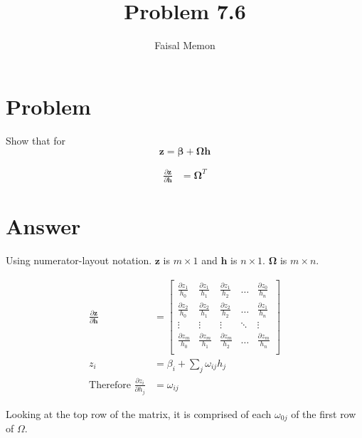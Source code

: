 \documentclass{article}
\title{Problem 7.6}
\author{Faisal Memon}
\begin{document}
\maketitle

\section{Problem}

Show that for \begin{equation*}
   \boldsymbol{z} = \boldsymbol{\beta} + \boldsymbol{\Omega}\boldsymbol{h}
\end{equation*}

\begin{align*}
   \frac{\partial{\boldsymbol{z}}}{\partial{\boldsymbol{h}}} &= \boldsymbol{\Omega}^{T}
\end{align*}

\section{Answer} 

Using numerator-layout notation. $\boldsymbol{z}$ is $ m \times 1 $ and $\boldsymbol{h}$ is $n \times 1$. $\boldsymbol{\Omega}$ is $m \times n$.

\begin{align*}
   \frac{\partial{\boldsymbol{z}}}{\partial{\boldsymbol{h}}} &=
   \begin{bmatrix}
      \frac{\partial{z}_{1}}{h_{0}} & \frac{\partial{z}_{1}}{h_{1}} &\frac{\partial{z}_{1}}{h_{2}} & \dots  & \frac{\partial{z}_{0}}{h_{n}} \\
      \frac{\partial{z}_{2}}{h_{0}} & \frac{\partial{z}_{2}}{h_{1}} &\frac{\partial{z}_{2}}{h_{2}} & \dots  & \frac{\partial{z}_{1}}{h_{n}} \\
      \vdots & \vdots & \vdots & \ddots & \vdots \\
      \frac{\partial{z}_{m}}{h_{0}} & \frac{\partial{z}_{m}}{h_{1}} &\frac{\partial{z}_{m}}{h_{2}} & \dots  & \frac{\partial{z}_{m}}{h_{n}} \\
  \end{bmatrix}
  \\
  z_{i} &= \beta_{i} + \sum_{j}\omega_{ij}h_{j} \\
  \text{Therefore }\frac{\partial{z_{i}}}{\partial{h_{j}}} &= \omega_{ij}
\end{align*}

Looking at the top row of the matrix, it is comprised of each $\omega_{0j}$ of the first row of $\Omega$.
\end{document}
